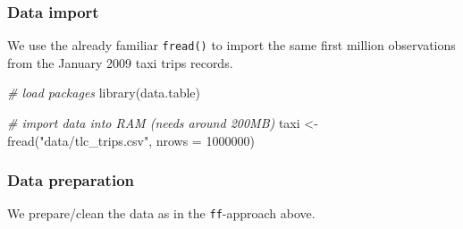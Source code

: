 \documentclass[
  12pt,
]{style/krantz}
\newenvironment{Shaded}{\begin{snugshade}}{\end{snugshade}}
\newcommand{\AttributeTok}[1]{\textcolor[rgb]{0.77,0.63,0.00}{#1}}
\newcommand{\CommentTok}[1]{\textcolor[rgb]{0.56,0.35,0.01}{\textit{#1}}}
\newcommand{\DecValTok}[1]{\textcolor[rgb]{0.00,0.00,0.81}{#1}}
\newcommand{\FunctionTok}[1]{\textcolor[rgb]{0.00,0.00,0.00}{#1}}
\newcommand{\NormalTok}[1]{#1}
\newcommand{\OtherTok}[1]{\textcolor[rgb]{0.56,0.35,0.01}{#1}}
\newcommand{\StringTok}[1]{\textcolor[rgb]{0.31,0.60,0.02}{#1}}
\begin{document}
\hypertarget{data-import-2}{%
\subsubsection{Data import}\label{data-import-2}}

We use the already familiar \texttt{fread()} to import the same first million observations from the January 2009 taxi trips records.

\begin{Shaded}
\begin{Highlighting}[]
\CommentTok{\# load packages}
\FunctionTok{library}\NormalTok{(data.table)}

\CommentTok{\# import data into RAM (needs around 200MB)}
\NormalTok{taxi }\OtherTok{\textless{}{-}} \FunctionTok{fread}\NormalTok{(}\StringTok{"data/tlc\_trips.csv"}\NormalTok{,}
              \AttributeTok{nrows =} \DecValTok{1000000}\NormalTok{)}
\end{Highlighting}
\end{Shaded}

\hypertarget{data-preparation}{%
\subsubsection{Data preparation}\label{data-preparation}}

We prepare/clean the data as in the \texttt{ff}-approach above.
\end{document}

